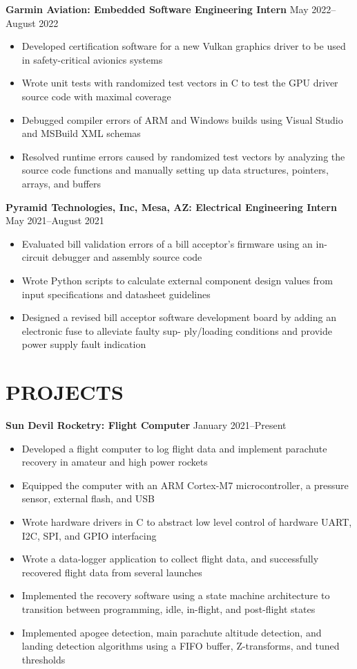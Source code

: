 \documentclass{article}
\begin{document}
\vspace{1em}
\textbf{Garmin Aviation: Embedded Software Engineering Intern}
\hfill
\vspace{0.5em}
May 2022--August 2022
\begin{itemize}
\item{Developed certification software for a new Vulkan graphics driver to be used in safety-critical avionics systems}
\item{Wrote unit tests with randomized test vectors in C to test the GPU driver source code with maximal coverage}
\item{Debugged compiler errors of ARM and Windows builds using Visual Studio and MSBuild XML schemas}
\item{Resolved runtime errors caused by randomized test vectors by analyzing the source code functions and manually setting up data structures, pointers, arrays, and buffers}
\end{itemize}
\vspace{1em}
\textbf{Pyramid Technologies, Inc, Mesa, AZ: Electrical Engineering Intern}
\hfill 
\vspace{0.5em}
May 2021--August 2021
\begin{itemize}
\item{Evaluated bill validation errors of a bill acceptor's firmware using an in-circuit debugger and assembly source code}
\item{Wrote Python scripts to calculate external component design values from input specifications and datasheet guidelines}
\item{Designed a revised bill acceptor software development board by adding an electronic fuse to alleviate faulty sup-
	ply/loading conditions and provide power supply fault indication}
\end{itemize}
\section{PROJECTS}
\textbf{Sun Devil Rocketry: Flight Computer}
\hfill
\vspace{0.5em}
January 2021--Present
\begin{itemize}
\item{Developed a flight computer to log flight data and implement parachute recovery in amateur and high power rockets}
\item{Equipped the computer with an ARM Cortex-M7 microcontroller, a pressure sensor, external flash, and USB}
\item{Wrote hardware drivers in C to abstract low level control of hardware UART, I2C, SPI, and GPIO interfacing}
\item{Wrote a data-logger application to collect flight data, and successfully recovered flight data from several launches}
\item{Implemented the recovery software using a state machine architecture to transition between programming, idle, in-flight, and post-flight states}
\item{Implemented apogee detection, main parachute altitude detection, and landing detection algorithms using a FIFO buffer, Z-transforms, and tuned thresholds}
\end{itemize}
\vspace{0.5em}
\thispagestyle{empty}
\end{document}
